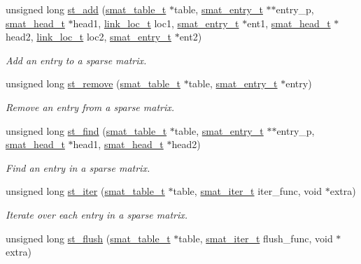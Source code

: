 \begin{CompactItemize}
unsigned long \hyperlink{group__dbprim__smat_ga13}{st\_\-add} (\hyperlink{struct__smat__table__s}{smat\_\-table\_\-t} $\ast$table, \hyperlink{struct__smat__entry__s}{smat\_\-entry\_\-t} $\ast$$\ast$entry\_\-p, \hyperlink{struct__smat__head__s}{smat\_\-head\_\-t} $\ast$head1, \hyperlink{group__dbprim__link_ga4}{link\_\-loc\_\-t} loc1, \hyperlink{struct__smat__entry__s}{smat\_\-entry\_\-t} $\ast$ent1, \hyperlink{struct__smat__head__s}{smat\_\-head\_\-t} $\ast$head2, \hyperlink{group__dbprim__link_ga4}{link\_\-loc\_\-t} loc2, \hyperlink{struct__smat__entry__s}{smat\_\-entry\_\-t} $\ast$ent2)
\begin{CompactList}\small\item\em Add an entry to a sparse matrix. \item\end{CompactList}\item 
unsigned long \hyperlink{group__dbprim__smat_ga14}{st\_\-remove} (\hyperlink{struct__smat__table__s}{smat\_\-table\_\-t} $\ast$table, \hyperlink{struct__smat__entry__s}{smat\_\-entry\_\-t} $\ast$entry)
\begin{CompactList}\small\item\em Remove an entry from a sparse matrix. \item\end{CompactList}\item 
unsigned long \hyperlink{group__dbprim__smat_ga15}{st\_\-find} (\hyperlink{struct__smat__table__s}{smat\_\-table\_\-t} $\ast$table, \hyperlink{struct__smat__entry__s}{smat\_\-entry\_\-t} $\ast$$\ast$entry\_\-p, \hyperlink{struct__smat__head__s}{smat\_\-head\_\-t} $\ast$head1, \hyperlink{struct__smat__head__s}{smat\_\-head\_\-t} $\ast$head2)
\begin{CompactList}\small\item\em Find an entry in a sparse matrix. \item\end{CompactList}\item 
unsigned long \hyperlink{group__dbprim__smat_ga16}{st\_\-iter} (\hyperlink{struct__smat__table__s}{smat\_\-table\_\-t} $\ast$table, \hyperlink{group__dbprim__smat_ga4}{smat\_\-iter\_\-t} iter\_\-func, void $\ast$extra)
\begin{CompactList}\small\item\em Iterate over each entry in a sparse matrix. \item\end{CompactList}\item 
unsigned long \hyperlink{group__dbprim__smat_ga17}{st\_\-flush} (\hyperlink{struct__smat__table__s}{smat\_\-table\_\-t} $\ast$table, \hyperlink{group__dbprim__smat_ga4}{smat\_\-iter\_\-t} flush\_\-func, void $\ast$extra)

\end{CompactItemize}
